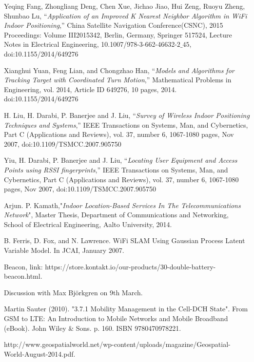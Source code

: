 \documentclass[a4paper,draft]{article}
\begin{document}
\begin{thebibliography}{9}

Yeqing Fang, Zhongliang Deng, Chen Xue, Jichao Jiao, Hui Zeng, Ruoyu Zheng, Shunbao Lu, “\textit{Application of an Improved K Nearest Neighbor Algorithm in WiFi Indoor Positioning},” China Satellite Navigation Conference(CSNC), 2015 Proceedings: Volume III2015342, Berlin, Germany, Springer 517524, Lecture Notes in Electrical Engineering, 10.1007/978-3-662-46632-$2\_45$, doi:10.1155/2014/649276



Xianghui Yuan, Feng Lian, and Chongzhao Han, “\textit{Models and Algorithms for Tracking Target with Coordinated Turn Motion},” Mathematical Problems in Engineering, vol. 2014, Article ID 649276, 10 pages, 2014. doi:10.1155/2014/649276

H. Liu, H. Darabi, P. Banerjee and J. Liu, “\textit{Survey of Wireless Indoor Positioning Techniques and Systems},” IEEE Transactions on Systems, Man, and Cybernetics, Part C (Applications and Reviews), vol. 37, number 6, 1067-1080 pages, Nov 2007, doi:10.1109/TSMCC.2007.905750

Yiu, H. Darabi, P. Banerjee and J. Liu, “\textit{Locating User Equipment and Access Points using RSSI fingerprints},” IEEE Transactions on Systems, Man, and Cybernetics, Part C (Applications and Reviews), vol. 37, number 6, 1067-1080 pages, Nov 2007, doi:10.1109/TSMCC.2007.905750

Arjun. P. Kamath,"\textit{Indoor Location-Based Services In The Telecommunications Network}", Master Thesis, Department of Communications and Networking, School of Electrical Engineering, Aalto University, 2014.

B. Ferris, D. Fox, and N. Lawrence. WiFi SLAM Using Gaussian Process Latent Variable Model. In JCAI, January 2007.
 
Beacon, link: https://store.kontakt.io/our-products/30-double-battery-beacon.html.
 
Discussion with Max Bj\"orkgren on 9th March.
 
Martin Sauter (2010). "3.7.1 Mobility Management in the Cell-DCH State". From GSM to LTE: An Introduction to Mobile Networks and Mobile Broadband (eBook). John Wiley \& Sons. p. 160. ISBN 9780470978221.

 http://www.geospatialworld.net/wp-content/uploads/magazine/Geospatial-World-August-2014.pdf.


\end{thebibliography}
\end{document}
